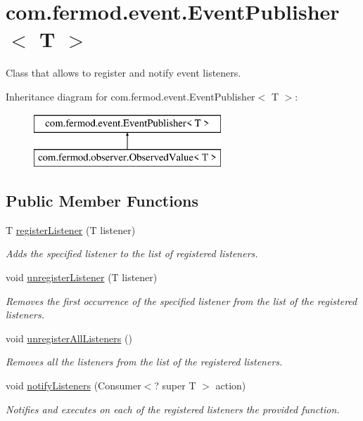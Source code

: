 \hypertarget{a00022}{}\section{com.\+fermod.\+event.\+Event\+Publisher$<$ T $>$}
\label{a00022}


Class that allows to register and notify event listeners.  


Inheritance diagram for com.\+fermod.\+event.\+Event\+Publisher$<$ T $>$\+:\begin{figure}[H]
\begin{center}
\leavevmode
\includegraphics[height=2.000000cm]{d7/de0/a00022}
\end{center}
\end{figure}
\subsection*{Public Member Functions}
\begin{DoxyCompactItemize}
\item 
T \mbox{\hyperlink{a00022_ad4ab74518bb83dede43fa2be3a38e8cd}{register\+Listener}} (T listener)
\begin{DoxyCompactList}\small\item\em Adds the specified listener to the list of registered listeners. \end{DoxyCompactList}\item 
void \mbox{\hyperlink{a00022_a26d9e5e851b0eae73fd9b81074dfc41f}{unregister\+Listener}} (T listener)
\begin{DoxyCompactList}\small\item\em Removes the first occurrence of the specified listener from the list of the registered listeners. \end{DoxyCompactList}\item 
void \mbox{\hyperlink{a00022_ac33f3e6657288e4872d3c942d6291687}{unregister\+All\+Listeners}} ()
\begin{DoxyCompactList}\small\item\em Removes all the listeners from the list of the registered listeners. \end{DoxyCompactList}\item 
void \mbox{\hyperlink{a00022_ad137b92c3d655d2e6cfd3349ffc41938}{notify\+Listeners}} (Consumer$<$? super T $>$ action)
\begin{DoxyCompactList}\small\item\em Notifies and executes on each of the registered listeners the provided function. \end{DoxyCompactList}\end{DoxyCompactItemize}
